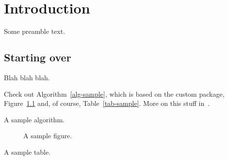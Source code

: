 \graphicspath{{./figs/intro/}}
\chapter{Introduction}
\label{chap-intro}

Some preamble text.

\section{Starting over}
Blah blah blah.

Check out Algorithm~\ref{alg-sample}, which is based on the
 custom package,
Figure~\ref{fig-sample} and, of course, Table~\ref{tab-sample}. More on this
stuff in~\cite{karakasis12cslab}.

\begin{algorithm}
  \algtoprule
  \begin{algorithmic}[1]
            \label{al-row-start}
            \EndFor\label{al-row-end}
        \EndFor
    \EndProcedure
  \end{algorithmic}
  \algbottomrule
  \caption{A sample algorithm.}
  \label{alg-sample}
\end{algorithm}

\begin{figure}
  \centering
  \caption{A sample figure.}
  \label{fig-sample}
\end{figure}

\begin{table}
  \centering
  \caption{A sample table.}
  \label{tab-sample}
\end{table}
